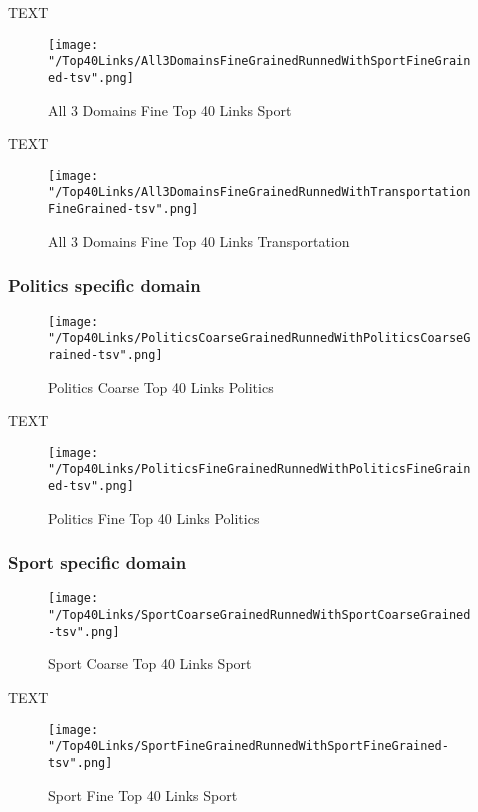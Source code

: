 \documentclass[thesis=M,english]{FITthesis}[2018/05/30]
\begin{document}
	TEXT	

	\begin{figure}[H]\centering
		\texttt{[image: "/Top40Links/All3DomainsFineGrainedRunnedWithSportFineGrained-tsv".png]}
		\caption{All 3 Domains Fine Top 40 Links Sport}\label{}
	\end{figure}
	
		TEXT	

	\begin{figure}[H]\centering
		\texttt{[image: "/Top40Links/All3DomainsFineGrainedRunnedWithTransportationFineGrained-tsv".png]}
		\caption{All 3 Domains Fine Top 40 Links Transportation}\label{}	
	\end{figure}
	
	\subsubsection{Politics specific domain}
	\begin{figure}[H]\centering
		\texttt{[image: "/Top40Links/PoliticsCoarseGrainedRunnedWithPoliticsCoarseGrained-tsv".png]}
		\caption{Politics Coarse Top 40 Links Politics}\label{}
	\end{figure}	

	TEXT	

	\begin{figure}[H]\centering
		\texttt{[image: "/Top40Links/PoliticsFineGrainedRunnedWithPoliticsFineGrained-tsv".png]}
		\caption{Politics Fine Top 40 Links Politics}\label{}
	\end{figure}

	\subsubsection{Sport specific domain}
	
	\begin{figure}[H]\centering
		\texttt{[image: "/Top40Links/SportCoarseGrainedRunnedWithSportCoarseGrained-tsv".png]}
		\caption{Sport Coarse Top 40 Links Sport}\label{}
	\end{figure}		
	
		TEXT	

	\begin{figure}[H]\centering
		\texttt{[image: "/Top40Links/SportFineGrainedRunnedWithSportFineGrained-tsv".png]}
		\caption{Sport Fine Top 40 Links Sport}\label{}	
	\end{figure}	
	
\end{document}
